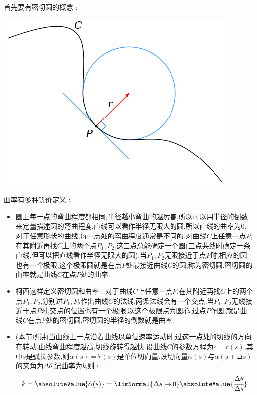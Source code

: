 {{{  首先要有密切圆的概念 :

  \begin{center}
    \includegraphics[scale = 0.5]{resources/Osculating_circle.png}
  \end{center}

  曲率有多种等价定义 : \begin{itemize}
    \item 圆上每一点的弯曲程度都相同,半径越小弯曲的越厉害,所以可以用半径的倒数来定量描述圆的弯曲程度.直线可以看作半径无限大的圆,所以直线的曲率为$0$.对于任意形状的曲线,每一点处的弯曲程度通常是不同的.对曲线$C$上任意一点$P$,在其附近再找$C$上的两个点$P_1,P_2$,这三点总能确定一个圆(三点共线时确定一条直线,但可以把直线看作半径无限大的圆).当$P_1,P_2$无限接近于点$P$时,相应的圆也有一个极限,这个极限圆就是在点$P$处最接近曲线$C$的圆,称为密切圆.密切圆的曲率就是曲线$C$在点$P$处的曲率.
    \item 柯西这样定义密切圆和曲率 : 对于曲线$C$上任意一点$P$,在其附近再找$C$上的两个点$P_1,P_2$,分别过$P_1,P_2$作出曲线$C$的法线,两条法线会有一个交点.当$P_1,P_2$无线接近于点$P$时,交点的位置也有一个极限,以这个极限点为圆心,过点$P$作圆,就是曲线$C$在点$P$处的密切圆,密切圆的半径的倒数就是曲率.
    \item (本节所讲)当曲线上一点沿着曲线以单位速率运动时,过这一点处的切线的方向在转动.曲线弯曲程度越高,切线旋转得越快.设曲线$C$的参数方程为$r = r(s)$,其中$s$是弧长参数,则$\alpha(s) = \dot{r}(s)$是单位切向量.设切向量$\alpha(s)$与$\alpha(s + \Delta s)$的夹角为$\Delta \theta$,记曲率为$k$,则 : $$
            k = \absoluteValue{\dot{\alpha}(s)} = \limNormal{\Delta s \to 0}\absoluteValue{\cfrac{\Delta \theta}{\Delta s}}
          $$
  \end{itemize}

}}}
